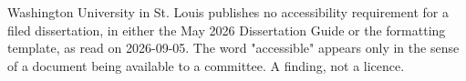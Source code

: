 %
	{Washington University in St. Louis publishes no accessibility requirement
	 for a filed dissertation, in either the May 2026 Dissertation Guide or the
	 formatting template, as read on 2026-09-05. The word "accessible" appears
	 only in the sense of a document being available to a committee. A finding,
	 not a licence.}


